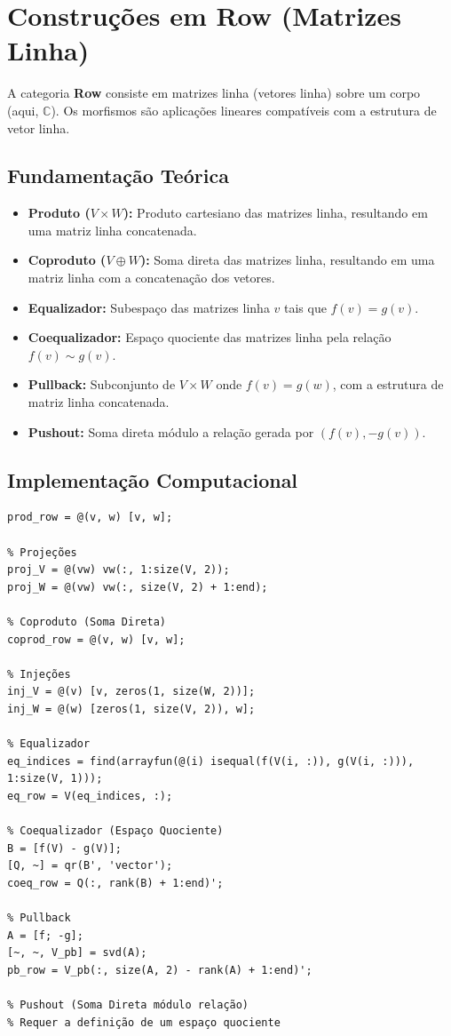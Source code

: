 \section{Construções em Row (Matrizes Linha)}

A categoria \textbf{Row} consiste em matrizes linha (vetores linha) sobre um corpo (aqui, $\mathbb{C}$). Os morfismos são aplicações lineares compatíveis com a estrutura de vetor linha.

\subsection{Fundamentação Teórica}
\begin{itemize}
    \item \textbf{Produto ($V \times W$):} Produto cartesiano das matrizes linha, resultando em uma matriz linha concatenada.
    \item \textbf{Coproduto ($V \oplus W$):} Soma direta das matrizes linha, resultando em uma matriz linha com a concatenação dos vetores.
    \item \textbf{Equalizador:} Subespaço das matrizes linha $v$ tais que $f(v) = g(v)$.
    \item \textbf{Coequalizador:} Espaço quociente das matrizes linha pela relação $f(v) \sim g(v)$.
    \item \textbf{Pullback:} Subconjunto de $V \times W$ onde $f(v) = g(w)$, com a estrutura de matriz linha concatenada.
    \item \textbf{Pushout:} Soma direta módulo a relação gerada por $(f(v), -g(v))$.
\end{itemize}

\subsection{Implementação Computacional}
\begin{lstlisting}[caption={Construções Universais em Row}]
% Produto (Concatenação de vetores linha)
prod_row = @(v, w) [v, w];

% Projeções
proj_V = @(vw) vw(:, 1:size(V, 2));
proj_W = @(vw) vw(:, size(V, 2) + 1:end);

% Coproduto (Soma Direta)
coprod_row = @(v, w) [v, w];

% Injeções
inj_V = @(v) [v, zeros(1, size(W, 2))];
inj_W = @(w) [zeros(1, size(V, 2)), w];

% Equalizador
eq_indices = find(arrayfun(@(i) isequal(f(V(i, :)), g(V(i, :))), 1:size(V, 1)));
eq_row = V(eq_indices, :);

% Coequalizador (Espaço Quociente)
B = [f(V) - g(V)];
[Q, ~] = qr(B', 'vector');
coeq_row = Q(:, rank(B) + 1:end)';

% Pullback
A = [f; -g];
[~, ~, V_pb] = svd(A);
pb_row = V_pb(:, size(A, 2) - rank(A) + 1:end)';

% Pushout (Soma Direta módulo relação)
% Requer a definição de um espaço quociente
\end{lstlisting}